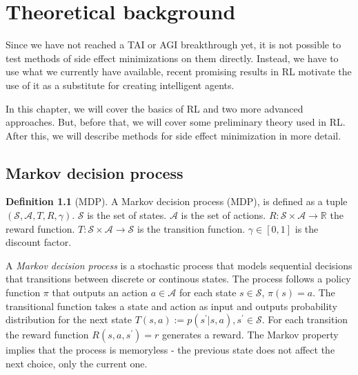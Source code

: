 \documentclass[12pt,A4]{report}
\theoremstyle{definition}
\newtheorem{definition}{Definition}[section]
\begin{document}
 


\chapter{Theoretical background}
Since we have not reached a TAI or AGI breakthrough yet, it is not possible to test methods of side effect minimizations on them directly. Instead, we have to use what we currently have available, recent promising results in RL motivate the use of it as a substitute for creating intelligent agents.

In this chapter, we will cover the basics of RL and two more advanced approaches. But, before that, we will cover some preliminary theory used in RL. After this, we will describe methods for side effect minimization in more detail.

\section{Markov decision process}
\begin{definition}[MDP]
    A Markov decision process (MDP), is defined as a tuple $(\mathcal{S}, \mathcal{A}, T, R, \gamma)$. $\mathcal{S}$ is the set of states. $\mathcal{A}$ is the set of actions. $R: \mathcal{S} \times \mathcal{A} \rightarrow \mathbb{R}$ the reward function. $T: \mathcal{S} \times \mathcal{A} \rightarrow \mathcal{S}$ is the transition function. $\gamma \in [0, 1]$ is the discount factor.
\end{definition}

A \textit{Markov decision process} is a stochastic process that models sequential decisions that transitions between discrete or continous states. The process follows a policy function $\pi$ that outputs an action $a \in \mathcal{A}$ for each state $s \in \mathcal{S}$, $\pi(s) = a$. The transitional function takes a state and action as input and outputs probability distribution for the next state $T(s,a) := p(s^\prime|s, a), s^\prime \in \mathcal{S}$. For each transition  the reward function $R(s, a, s^\prime) = r$ generates a reward. The Markov property implies that the process is memoryless - the previous state does not affect the next choice, only the current one. 
\end{document}
